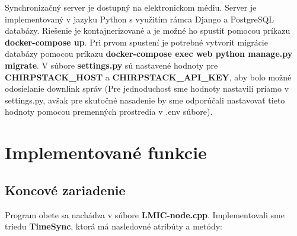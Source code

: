 Synchronizačný server je dostupný na elektronickom médiu. Server je implementovaný v jazyku Python s využitím rámca Django a PostgreSQL databázy. Riešenie je kontajnerizované a je možné ho spustiť pomocou príkazu \textbf{docker-compose up}. Pri prvom spustení je potrebné vytvoriť migrácie databázy pomocou príkazu \textbf{docker-compose exec web python manage.py migrate}. V súbore \textbf{settings.py} sú nastavené hodnoty pre \textbf{CHIRPSTACK\_HOST} a \textbf{CHIRPSTACK\_API\_KEY}, aby bolo možné odosielanie downlink správ (Pre jednoduchosť sme hodnoty nastavili priamo v settings.py, avšak pre skutočné nasadenie by sme odporúčali nastavovať tieto hodnoty pomocou premenných prostredia v .env súbore).


\section{Implementované funkcie}

\subsection{Koncové zariadenie}

Program obete sa nachádza v súbore \textbf{LMIC-node.cpp}. Implementovali sme triedu \textbf{TimeSync}, ktorá má nasledovné atribúty a metódy:

